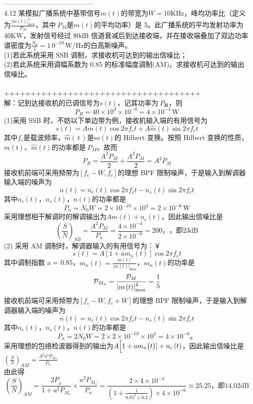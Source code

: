 \documentclass[utf8]{article}
\begin{document}
---------------------------------------\\
4.12 某模拟广播系统中基带信号$m(t)$的带宽为$W=10\mathrm{KHz}$，峰均功率比（定义为$\frac{|m(t)\vert_{\mathrm{max}}^{2}}{P_{M}}$，其中$\ P_{M}$是$m(t)$的平均功率）是 5。此广播系统的平均发射功率为 40KW，发射信号经过 80dB 信道衰减后到达接收端，并在接收端叠加了双边功率谱密度为$\frac{N_{0}}{2}=1\,0^{-10}\,\mathrm{W/Hz}$的白高斯噪声。\\
(1)若此系统采用 SSB 调制，求接收机可达到的输出信噪比；\\
(2)若此系统采用调幅系数为 0.85 的标准幅度调制(AM)，求接收机可达到的输出信噪比。\\
\\
+++++++++++++++++++++++++++++++++++++\\
解：记到达接收机的已调信号为$s(t)$，记其功率为$\ P_{\boldsymbol{R}}$，则
$$P_{R}=40\times10^{3}\times10^{-8}=4\times10^{-4}\,\mathrm{W}$$
(1)采用 SSB 时，不妨以下单边带为例，接收机输入端的有用信号为
$$s\left(t\right)=A m\left(t\right)\cos2\pi f_{c}t+A\hat{m}\left(t\right)\sin2\pi f_{c}t$$
其中$f_{c}$是载波频率，${\hat{m}}\left(\,t\,\right)$是$m(t)$的 Hilbert 变换。按照 Hilbert 变换的性质，$m(t)$、${\hat{m}}(t)$的功率都是$\ P_{M}$。故而
$$P_{R}=\frac{A^{2}P_{M}}{2}+\frac{A^{2}P_{M}}{2}=A^{2}P_{M}$$
接收机前端可采用频带为$\left[f_{c}-W,f_{c}\right]$的理想 BPF 限制噪声，于是输入到解调器输入端的噪声为
$$n\left(t\right)=n_{c}\left(t\right)\cos2\pi f_{c}t-n_{s}\left(t\right)\sin2\pi f_{c}t$$
其中${n}_{c}(t)$，${n}_{s}(t)$，${n}(t)$的功率都是
$$P_{n}=N_{0}W=2\times10^{-10}\times10^{4}=2\times10^{-6}\,\mathrm{W}$$
采用理想相干解调时的解调输出为$A m\left(t\right)+n_{c}\left(t\right)$，因此输出信噪比是
$$\left({\frac{S}{N}}\right)_{S B}={\frac{A^{2}P_{M}}{P_{n}}}={\frac{4\times10^{-4}}{2\times10^{-6}}}=200，\text{，即23dB}$$
(2) 采用 AM 调制时，解调器输入的有用信号为：￥$$s\left(t\right)=A\left[1+a m_{n}\left(t\right)\right]\cos2\pi f_{c}t$$
其中调制指数 a = 0.85，$m_{n}\left(t\right)=\frac{m\left(t\right)}{\left|m\left(t\right)\right|_{\mathrm{max}}}$，$m_{n}\left(t\right)$的功率是
$${\cal P}_{M_{n}}=\frac{{\cal P}_{M}}{\left|m\left(t\right)\right|_{\mathrm{max}}^{2}}=\frac{1}{5}$$
接收机前端可采用频带为$\left[f_{c}-W,f_{c}+W\right]$的理想 BPF 限制噪声，于是输入到解调器输入端的噪声为
$$n\left(t\right)=n_{c}\left(t\right)\cos2\pi f_{c}t-n_{s}\left(t\right)\sin2\pi f_{c}t$$
其中${n_{c}}(t)$，${n_{s}}(t)$，${{n}}(t)$的功率都是$$P_{n}=2N_{0}W=2\times2\times10^{-10}\times10^{4}=4\times10^{-6}\text{。}$$
采用理想的包络检波器得到的输出为${A}\Bigl[1+a m_{n}\bigl(t\bigr)\rbrack+n_{c}\left(t\right)$，因此输出信噪比是$\left(\frac{S}{N}\right)_{A M}=\frac{A^{2}a^{2}P_{M_{n}}}{P_{n}}$\\
由此得
$$\left(\frac{S}{N}\right)_{A M}=\frac{2P_{_R}}{1+a^{2}P_{M_{s}}}\times\frac{a^{2}P_{M_{s}}}{P_{n}}=\frac{2\times4\times10^{-4}}{\left(1+\frac{1}{0.85^{2}\times0.2}\right)\times4\times10^{-6}}\approx25.25\text{，即14.02dB}$$
\end{document}
